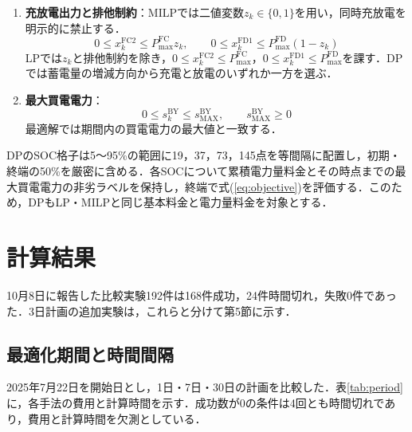 \documentclass[a4paper,11pt,xelatex,ja=standard]{bxjsarticle}
\begin{document}
\begin{enumerate}
    \item \textbf{充放電出力と排他制約}：MILPでは二値変数$z_k\in\{0,1\}$を用い，同時充放電を明示的に禁止する．
          \begin{equation}
              0\leq x^{\mathrm{FC2}}_k\leq P^{\mathrm{FC}}_{\mathrm{max}}z_k,
              \qquad
              0\leq x^{\mathrm{FD1}}_k\leq P^{\mathrm{FD}}_{\mathrm{max}}(1-z_k)
              \label{eq:exclusive}
          \end{equation}
          LPでは$z_k$と排他制約を除き，$0\leq x^{\mathrm{FC2}}_k\leq P^{\mathrm{FC}}_{\mathrm{max}}$，$0\leq x^{\mathrm{FD1}}_k\leq P^{\mathrm{FD}}_{\mathrm{max}}$を課す．DPでは蓄電量の増減方向から充電と放電のいずれか一方を選ぶ．

    \item \textbf{最大買電電力}：
          \begin{equation}
              0\leq s^{\mathrm{BY}}_k\leq s^{\mathrm{BY}}_{\mathrm{MAX}},
              \qquad s^{\mathrm{BY}}_{\mathrm{MAX}}\geq0
              \label{eq:max-buy}
          \end{equation}
          最適解では期間内の買電電力の最大値と一致する．
\end{enumerate}

DPのSOC格子は5～95\%の範囲に19，37，73，145点を等間隔に配置し，初期・終端の50\%を厳密に含める．各SOCについて累積電力量料金とその時点までの最大買電電力の非劣ラベルを保持し，終端で式(\ref{eq:objective})を評価する．このため，DPもLP・MILPと同じ基本料金と電力量料金を対象とする．

\endgroup

\clearpage
\section{計算結果}
10月8日に報告した比較実験192件は168件成功，24件時間切れ，失敗0件であった．3日計画の追加実験は，これらと分けて第5節に示す．

\subsection{最適化期間と時間間隔}
2025年7月22日を開始日とし，1日・7日・30日の計画を比較した．表\ref{tab:period}に，各手法の費用と計算時間を示す．成功数が0の条件は4回とも時間切れであり，費用と計算時間を欠測としている．
\end{document}
